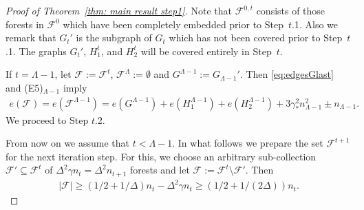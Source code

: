 \documentclass[a4paper, 11pt, reqno]{amsart}
\numberwithin{equation}{section}
\newcommand{\1}{{\rm 1\hspace*{-0.4ex}%
\rule{0.1ex}{1.52ex}\hspace*{0.2ex}}}
\newcommand{\es}{\emptyset}
\newcommand{\cF}{\mathcal{F}}
\newcounter{step}
\begin{document}
\begin{proof}[Proof of Theorem~\ref{thm: main result step1}]
Note that $\cF^{0,t}$ consists of those forests in $\cF^0$ which have been completely embedded prior to Step~$t$.1.
Also we remark that $G_t'$ is the subgraph of $G_t$ which has not been covered prior to Step~$t$.1.
The graphs $G_t'$, $H_1^t$, and $H_2^t$ will be covered entirely in Step~$t$.


\bigskip

If $t = \Lambda -1$, let $\cF:= \cF^t$, $\cF^{\Lambda}:=\es$ and $G^{\Lambda-1}:=G_{\Lambda-1}'$.
Then \eqref{eq:edgesGlast} and (E5)$_{\Lambda-1}$ imply
\begin{align}\label{eq:edgeslast}
e(\cF)
=e(\cF^{\Lambda-1})
=e(G^{\Lambda-1})+e(H_1^{\Lambda-1})+e(H_2^{\Lambda-1})+3\gamma_*^2 n_{\Lambda-1}^2 \pm n_{\Lambda-1}.
\end{align}
We proceed to Step $t$.2.

From now on we assume that 
$t< \Lambda-1$.
In what follows we prepare the set $\cF^{t+1}$ for the next iteration step.
For this, we choose an arbitrary sub-collection $\cF'\subseteq \cF^t$ of $\Delta^2 \gamma n_{t}=\Delta^2n_{t+1}$ forests and 
let $\cF := \cF^t \setminus \cF'$. 
Then 
\begin{align}\label{eq:sizeF1}
	|\cF|\geq (1/2+ 1/\Delta)n_t - \Delta^2 \gamma n_{t} \geq (1/2 + 1/(2\Delta)) n_t. 
\end{align}


\end{proof}
\end{document}
